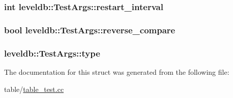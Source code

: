 \subsubsection[{restart\+\_\+interval}]{\setlength{\rightskip}{0pt plus 5cm}int leveldb\+::\+Test\+Args\+::restart\+\_\+interval}\label{structleveldb_1_1_test_args_a233f5e5e56ff872e26f543585824df1d}
\hypertarget{structleveldb_1_1_test_args_ab4c8bef944a4ddf845378f1fce2b6c22}{}
\subsubsection[{reverse\+\_\+compare}]{\setlength{\rightskip}{0pt plus 5cm}bool leveldb\+::\+Test\+Args\+::reverse\+\_\+compare}\label{structleveldb_1_1_test_args_ab4c8bef944a4ddf845378f1fce2b6c22}
\hypertarget{structleveldb_1_1_test_args_a1c2c14e2506bf6c238a2685c38eb16ac}{}
\subsubsection[{type}]{ leveldb\+::\+Test\+Args\+::type}\label{structleveldb_1_1_test_args_a1c2c14e2506bf6c238a2685c38eb16ac}


The documentation for this struct was generated from the following file\+:\begin{DoxyCompactItemize}
\item 
table/\hyperlink{table__test_8cc}{table\+\_\+test.\+cc}\end{DoxyCompactItemize}

